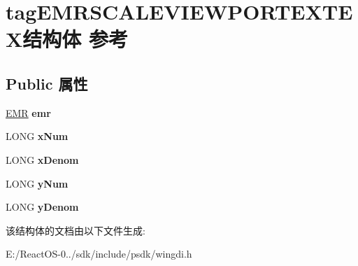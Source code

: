 \hypertarget{structtag_e_m_r_s_c_a_l_e_v_i_e_w_p_o_r_t_e_x_t_e_x}{}\section{tag\+E\+M\+R\+S\+C\+A\+L\+E\+V\+I\+E\+W\+P\+O\+R\+T\+E\+X\+T\+E\+X结构体 参考}
\label{structtag_e_m_r_s_c_a_l_e_v_i_e_w_p_o_r_t_e_x_t_e_x}
\subsection*{Public 属性}
\begin{DoxyCompactItemize}
\item 
\mbox{\label{structtag_e_m_r_s_c_a_l_e_v_i_e_w_p_o_r_t_e_x_t_e_x_a6dcbb0b89dc126793c10367d437c605a}} 
\hyperlink{structtag_e_m_r}{E\+MR} {\bfseries emr}
\item 
\mbox{\label{structtag_e_m_r_s_c_a_l_e_v_i_e_w_p_o_r_t_e_x_t_e_x_aa2c73b6af61eb81a3429d165dbb57209}} 
L\+O\+NG {\bfseries x\+Num}
\item 
\mbox{\label{structtag_e_m_r_s_c_a_l_e_v_i_e_w_p_o_r_t_e_x_t_e_x_ad2a7ccade52af55b0f36f02cae412f82}} 
L\+O\+NG {\bfseries x\+Denom}
\item 
\mbox{\label{structtag_e_m_r_s_c_a_l_e_v_i_e_w_p_o_r_t_e_x_t_e_x_aa2d72cfcdc27418c3b8fba413097942b}} 
L\+O\+NG {\bfseries y\+Num}
\item 
\mbox{\label{structtag_e_m_r_s_c_a_l_e_v_i_e_w_p_o_r_t_e_x_t_e_x_ab3f68ce8cadd121f940071f66eea905c}} 
L\+O\+NG {\bfseries y\+Denom}
\end{DoxyCompactItemize}


该结构体的文档由以下文件生成\+:\begin{DoxyCompactItemize}
\item 
E\+:/\+React\+O\+S-\/0../sdk/include/psdk/wingdi.\+h\end{DoxyCompactItemize}
